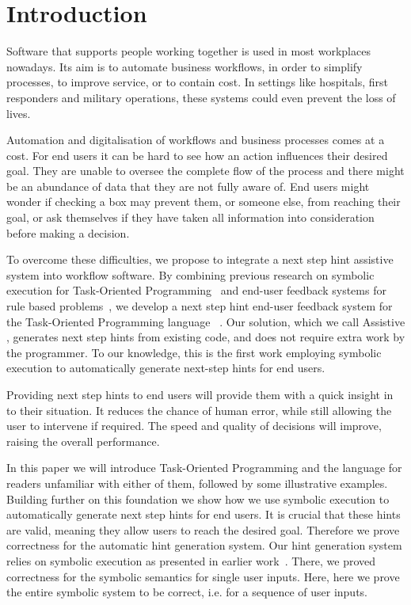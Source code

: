 
\section{Introduction}
\label{sec:intro}

Software that supports people working together is used in most workplaces nowadays.
Its aim is to automate business workflows, in order to simplify processes, to improve service, or to contain cost.
In settings like hospitals, first responders and military operations, these systems could even prevent the loss of lives.

Automation and digitalisation of workflows and business processes comes at a cost.
For end users it can be hard to see how an action influences their desired goal.
They are unable to oversee the complete flow of the process
and there might be an abundance of data that they are not fully aware of.
End users might wonder if checking a box may prevent them, or someone else, from reaching their goal,
or ask themselves if they have taken all information into consideration before making a decision.

To overcome these difficulties, we propose to integrate a next step hint assistive system into workflow software.
By combining previous research on symbolic execution for Task-Oriented Programming~\cite{Naus2019} and end-user feedback systems for rule based problems~\cite{DBLP:conf/sfp/NausJ16},
we develop a next step hint end-user feedback system for the Task-Oriented Programming language \TOPHAT~\cite{DBLP:conf/ppdp/SteenvoordenNK19}.
Our solution, which we call Assistive \TOPHAT, generates next step hints from existing code, and does not require extra work by the programmer.
To our knowledge, this is the first work employing symbolic execution to automatically generate next-step hints for end users.

Providing next step hints to end users will provide them with a quick insight in to their situation.
It reduces the chance of human error, while still allowing the user to intervene if required.
The speed and quality of decisions will improve, raising the overall performance.

In this paper we will introduce Task-Oriented Programming and the \TOPHAT language for readers unfamiliar with either of them,
followed by some illustrative examples.
Building further on this foundation we show how we use symbolic execution to automatically generate next step hints for end users.
It is crucial that these hints are valid, meaning they allow users to reach the desired goal.
Therefore we prove correctness for the automatic hint generation system.
Our hint generation system relies on symbolic execution as presented in earlier work~\cite{Naus2019}.
There, we proved correctness for the symbolic semantics for single user inputs.
Here, here we prove the entire symbolic system to be correct, i.e. for a sequence of user inputs.


